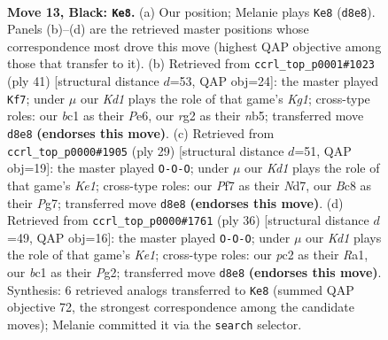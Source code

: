 \documentclass[11pt]{article}
\begin{document}
\clearpage

\begin{figure}[p]\centering
\begin{subfigure}{0.46\textwidth}\centering
\resizebox{\linewidth}{!}{%
\newchessgame
\chessboard[
  setfen={r1bk1b1r/p1p2p1p/2p3p1/8/7P/8/PPP2PR1/RNB1K3 b Q - 0 13},
  showmover=false,
  pgfstyle=straightmove, color=movearrow, markmove={d8-e8}
]}
\caption{}
\end{subfigure}\hfill
\begin{subfigure}{0.46\textwidth}\centering
\resizebox{\linewidth}{!}{%
\newchessgame
\chessboard[
  setfen={r1b3k1/p5bp/1p2p1p1/1N2P3/2Pp4/8/PP4PP/4RB1K b - - 1 21},
  showmover=false,
  pgfstyle=straightmove, color=movearrow, markmove={g8-f7}
]}
\caption{}
\end{subfigure}
\\[4pt]
\begin{subfigure}{0.46\textwidth}\centering
\resizebox{\linewidth}{!}{%
\newchessgame
\chessboard[
  setfen={r3kb1r/p1pn2pp/1p2p3/8/4P3/4BP2/PP4PP/2R1K1NR b Kkq - 1 15},
  showmover=false,
  pgfstyle=straightmove, color=movearrow, markmove={e8-c8}
]}
\caption{}
\end{subfigure}\hfill
\begin{subfigure}{0.46\textwidth}\centering
\resizebox{\linewidth}{!}{%
\newchessgame
\chessboard[
  setfen={1r1r4/p1pb2kp/p5p1/4p3/2P5/5B2/PP3PPP/R3K2R w KQ - 2 19},
  showmover=false,
  pgfstyle=straightmove, color=movearrow, markmove={e1-c1}
]}
\caption{}
\end{subfigure}
\caption{\textbf{Move 13, Black: \texttt{Ke8}.} (a) Our position; Melanie plays \texttt{Ke8} (\texttt{d8e8}). Panels (b)--(d) are the retrieved master positions whose correspondence most drove this move (highest QAP objective among those that transfer to it). (b) Retrieved from \texttt{ccrl\_top\_p0001\#1023} (ply 41) [structural distance $d$=53, QAP obj=24]: the master played \texttt{Kf7}; under $\mu$ our \emph{Kd1} plays the role of that game's \emph{Kg1}; cross-type roles: our \emph{b}c1 as their \emph{P}e6, our \emph{r}g2 as their \emph{n}b5; transferred move \texttt{d8e8} \textbf{(endorses this move)}. (c) Retrieved from \texttt{ccrl\_top\_p0000\#1905} (ply 29) [structural distance $d$=51, QAP obj=19]: the master played \texttt{O-O-O}; under $\mu$ our \emph{Kd1} plays the role of that game's \emph{Ke1}; cross-type roles: our \emph{P}f7 as their \emph{N}d7, our \emph{B}c8 as their \emph{P}g7; transferred move \texttt{d8e8} \textbf{(endorses this move)}. (d) Retrieved from \texttt{ccrl\_top\_p0000\#1761} (ply 36) [structural distance $d$=49, QAP obj=16]: the master played \texttt{O-O-O}; under $\mu$ our \emph{Kd1} plays the role of that game's \emph{Ke1}; cross-type roles: our \emph{p}c2 as their \emph{R}a1, our \emph{b}c1 as their \emph{P}g2; transferred move \texttt{d8e8} \textbf{(endorses this move)}. Synthesis: 6 retrieved analogs transferred to \texttt{Ke8} (summed QAP objective 72, the strongest correspondence among the candidate moves); Melanie committed it via the \texttt{search} selector.}
\label{fig:thought-m25}
\end{figure}
\end{document}
